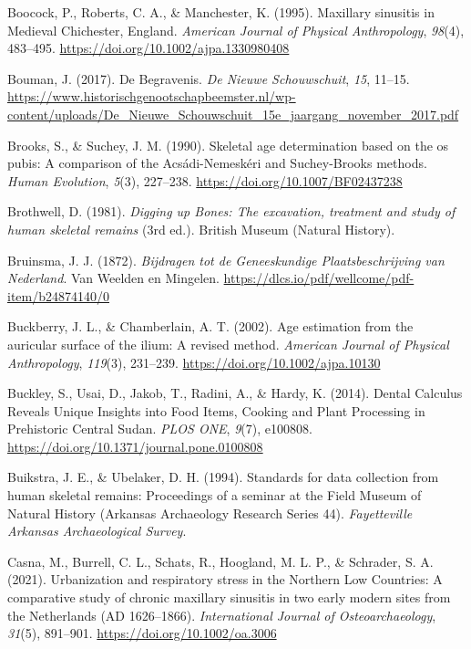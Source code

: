 \documentclass[
  11pt,
  leqno]{scrartcl}
\newlength{\cslhangindent}
\newenvironment{CSLReferences}[2] %
 {\begin{list}{}{%
  \setlength{\itemindent}{0pt}
  \setlength{\leftmargin}{0pt}
  \setlength{\parsep}{0pt}
  \ifodd #1
   \setlength{\leftmargin}{\cslhangindent}
   \setlength{\itemindent}{-1\cslhangindent}
  \fi
  \setlength{\itemsep}{#2\baselineskip}}}
 {\end{list}}
\begin{document}
\begin{CSLReferences}{1}{0}
Boocock, P., Roberts, C. A., \& Manchester, K. (1995). Maxillary
sinusitis in {Medieval Chichester}, {England}. \emph{American Journal of
Physical Anthropology}, \emph{98}(4), 483--495.
\url{https://doi.org/10.1002/ajpa.1330980408}

Bouman, J. (2017). De Begravenis. \emph{De Nieuwe Schouwschuit},
\emph{15}, 11--15.
\url{https://www.historischgenootschapbeemster.nl/wp-content/uploads/De_Nieuwe_Schouwschuit_15e_jaargang_november_2017.pdf}

Brooks, S., \& Suchey, J. M. (1990). Skeletal age determination based on
the os pubis: {A} comparison of the {Acsádi-Nemeskéri} and
{Suchey-Brooks} methods. \emph{Human Evolution}, \emph{5}(3), 227--238.
\url{https://doi.org/10.1007/BF02437238}

Brothwell, D. (1981). \emph{Digging up {Bones}: {The} excavation,
treatment and study of human skeletal remains} (3rd ed.). {British
Museum (Natural History)}.

Bruinsma, J. J. (1872). \emph{Bijdragen tot de {Geneeskundige
Plaatsbeschrijving} van {Nederland}}. {Van Weelden en Mingelen}.
\url{https://dlcs.io/pdf/wellcome/pdf-item/b24874140/0}

Buckberry, J. L., \& Chamberlain, A. T. (2002). Age estimation from the
auricular surface of the ilium: A revised method. \emph{American Journal
of Physical Anthropology}, \emph{119}(3), 231--239.
\url{https://doi.org/10.1002/ajpa.10130}

Buckley, S., Usai, D., Jakob, T., Radini, A., \& Hardy, K. (2014).
Dental {Calculus Reveals Unique Insights} into {Food Items}, {Cooking}
and {Plant Processing} in {Prehistoric Central Sudan}. \emph{PLOS ONE},
\emph{9}(7), e100808. \url{https://doi.org/10.1371/journal.pone.0100808}

Buikstra, J. E., \& Ubelaker, D. H. (1994). Standards for data
collection from human skeletal remains: {Proceedings} of a seminar at
the {Field Museum} of {Natural History} ({Arkansas Archaeology Research
Series} 44). \emph{Fayetteville Arkansas Archaeological Survey}.

Casna, M., Burrell, C. L., Schats, R., Hoogland, M. L. P., \& Schrader,
S. A. (2021). Urbanization and respiratory stress in the {Northern Low
Countries}: {A} comparative study of chronic maxillary sinusitis in two
early modern sites from the {Netherlands} ({AD} 1626--1866).
\emph{International Journal of Osteoarchaeology}, \emph{31}(5),
891--901. \url{https://doi.org/10.1002/oa.3006}


\end{CSLReferences}
\end{document}
